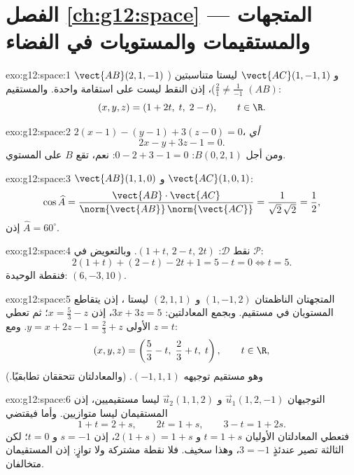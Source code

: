 \section*{الفصل \ref{ch:g12:space} --- المتجهات والمستقيمات والمستويات في الفضاء}

\begin{solution}{exo:g12:space:1}
$\vect{AB}(2, 1, -1)$ و $\vect{AC}(1, -1, 1)$ ليستا متناسبتين
($\frac21 \neq \frac{1}{-1}$)، إذن النقط ليست على استقامة واحدة. والمستقيم $(AB)$:
\[
(x, y, z) = (1 + 2t,\; t,\; 2 - t), \qquad t \in \R .
\]
\end{solution}

\begin{solution}{exo:g12:space:2}
$2(x - 1) - (y - 1) + 3(z - 0) = 0$، \emph{أي}
\[
2x - y + 3z - 1 = 0 .
\]
ومن أجل $B(0,2,1)$: $0 - 2 + 3 - 1 = 0$: نعم، تقع $B$ على المستوي.
\end{solution}

\begin{solution}{exo:g12:space:3}
$\vect{AB}(1,1,0)$ و $\vect{AC}(1,0,1)$:
\[
\cos\widehat{A}
= \frac{\vect{AB}\cdot\vect{AC}}{\norm{\vect{AB}}\,\norm{\vect{AC}}}
= \frac{1}{\sqrt2\,\sqrt2} = \frac12,
\]
إذن $\widehat A = 60^\circ$.
\end{solution}

\begin{solution}{exo:g12:space:4}
نقط $\mathcal D$: $(1 + t,\, 2 - t,\, 2t)$. وبالتعويض في
 $\mathcal P$:
\[
2(1+t) + (2 - t) - 2t + 1 = 5 - t = 0 \iff t = 5 .
\]
فنقطة  الوحيدة: $(6, -3, 10)$.
\end{solution}

\begin{solution}{exo:g12:space:5}
المتجهتان الناظمتان $(1, -1, 2)$ و $(2, 1, 1)$ ليستا ، إذن
يتقاطع المستويان في مستقيم. وبجمع المعادلتين: $3x + 3z = 5$، إذن
$x = \frac53 - z$؛ ثم تعطي  الأولى
$y = x + 2z - 1 = \frac23 + z$. ومع $z = t$:
\[
(x, y, z) = \left(\frac53 - t,\; \frac23 + t,\; t\right), \qquad t \in \R,
\]
وهو مستقيم  توجيهه $(-1, 1, 1)$. (والمعادلتان تتحققان
تطابقيًا.)
\end{solution}

\begin{solution}{exo:g12:space:6}
التوجيهان $\vec u_1(1, 2, -1)$ و $\vec u_2(1, 1, 2)$ ليسا مستقيميين،
إذن المستقيمان ليسا متوازيين. وأما  فيقتضي
\[
1 + t = 2 + s, \qquad 2t = 1 + s, \qquad 3 - t = 1 + 2s .
\]
فتعطي المعادلتان الأوليان $t = 1 + s$ و $2(1+s) = 1 + s$، إذن $s = -1$ و $t = 0$؛
لكن الثالثة تصير عندئذٍ $3 = -1$، وهذا سخيف. فلا نقطة مشتركة ولا
توازٍ: إذن المستقيمان متخالفان.
\end{solution}

